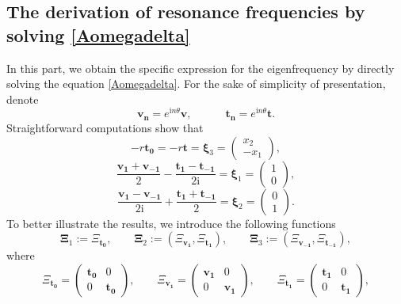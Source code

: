 \documentclass[10pt,reqno,oneside]{amsart}%
\theoremstyle{definition}
\theoremstyle{remark}
\numberwithin{equation}{section}
\numberwithin{equation}{section}
\begin{document}
\subsection{The derivation of resonance frequencies by solving \eqref{Aomegadelta}}In this part, we obtain the
specific expression for the eigenfrequency by directly solving the equation \eqref{Aomegadelta}. For the sake of simplicity of presentation, denote%
$$
\boldsymbol{v_{n}}=e^{\mathrm{i} n \theta} \boldsymbol{v},\quad\quad \quad \boldsymbol{t_{n}}=e^{\mathrm{i} n \theta} \boldsymbol{t}.
$$
Straightforward computations show that
$$
-r\boldsymbol{t_{0}}=-r\boldsymbol{t}=\boldsymbol{\xi}_3=
\left(\begin{array}{l}
x_{2} \\
-x_{1}
\end{array}\right),
$$
$$
\frac{\boldsymbol{v_{1}}+\boldsymbol{v_{-1}}}{2}-\frac{\boldsymbol{t_{1}}-\boldsymbol{t_{-1}}}{2\mathrm{i}}=\boldsymbol{\xi}_1=
\left(\begin{array}{l}
1 \\
0
\end{array}\right),
$$
$$
\frac{\boldsymbol{v_{1}}-\boldsymbol{v_{-1}}}{2\mathrm{i}}+\frac{\boldsymbol{t_{1}}+\boldsymbol{t_{-1}}}{2}=\boldsymbol{\xi}_2=
\left(\begin{array}{l}
0 \\
1
\end{array}\right).
$$
To better illustrate the results, we introduce the following functions
\[
\boldsymbol{\Xi}_1:=\Xi_{\boldsymbol{ t_{0}}},\quad\quad  \boldsymbol{\Xi}_2:=(\Xi_{\boldsymbol{ v_{1}}},\Xi_{\boldsymbol{ t_{1}}}), \quad \quad \boldsymbol{\Xi}_3:=(\Xi_{\boldsymbol{ v_{-1}}},\Xi_{\boldsymbol{ t_{-1}}}),\nonumber
\]
where
\begin{equation}
\Xi_{\boldsymbol{ t_{0}}}=
\begin{pmatrix}
\boldsymbol{t_{0}}& 0 \\
0&\boldsymbol{t_{0}}
\end{pmatrix},\quad\quad
\Xi_{\boldsymbol{ v_{1}}}=
\begin{pmatrix}
\boldsymbol{v_{1}}& 0 \\
0&\boldsymbol{v_{1}}
\end{pmatrix},\quad\quad
\Xi_{\boldsymbol{ t_{1}}}=
\begin{pmatrix}
\boldsymbol{t_{1}}& 0 \\
0&\boldsymbol{t_{1}}
\end{pmatrix},\nonumber
\end{equation}
\end{document}
